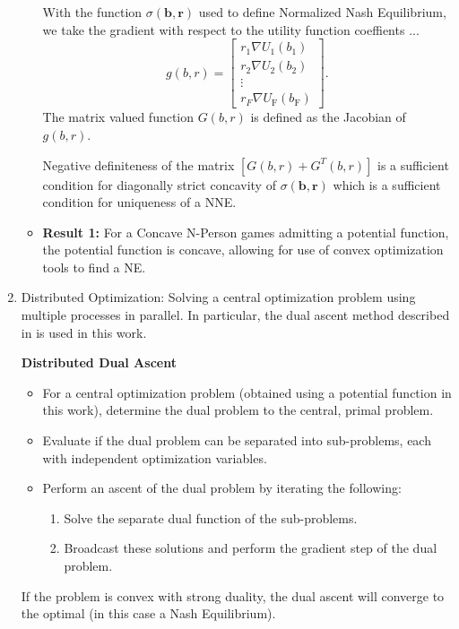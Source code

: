 \documentclass[12pt,a4paper]{report}
\begin{document}
\begin{enumerate}
\begin{itemize}
With the function  $
\sigma(\mathbf{b},\mathbf{r})$
used to define Normalized Nash Equilibrium, we take the gradient with respect to the utility function coeffients ... 
\begin{equation}
g(b,r)= 
\begin{bmatrix}
r_1 \nabla U_{1}(b_1)
\\
r_2 \nabla U_{2}(b_2)
\\
\vdots\\
r_F \nabla U_{\text{F}}(b_{\text{F}})
\end{bmatrix}.
\end{equation}
 The matrix valued function $G(b,r) $ is defined as the Jacobian of $g(b,r) $.

Negative definiteness of the matrix $[G(b,r)+G^{T}(b,r)] $ is a sufficient condition for diagonally strict concavity of $\sigma(\mathbf{b},\mathbf{r})$ which is a sufficient condition for uniqueness of a NNE.
\item \textbf{Result 1:} For a Concave N-Person games admitting a potential function, the potential function is concave, allowing for use of convex optimization tools to find a NE. 

\end{itemize}




\item Distributed Optimization: Solving a central optimization problem using multiple processes in parallel.
In particular, the dual ascent method described in \cite{boyd2011distributed} is used in this work.

\textbf{Distributed Dual Ascent} 
\begin{itemize}
\item For a central optimization problem (obtained using a potential function in this work), determine the dual problem to the central, primal problem.
\item Evaluate if the dual problem can be separated into sub-problems, each with independent optimization variables.
\item Perform an ascent of the dual problem by iterating the following:
\begin{enumerate}
\item Solve the separate dual function of the sub-problems.
\item Broadcast these solutions and perform the gradient step of the dual problem.
\end{enumerate}
\end{itemize}

If the problem is convex with strong duality, the dual ascent will converge to the optimal (in this case a Nash Equilibrium).

\end{enumerate}
\end{document}
